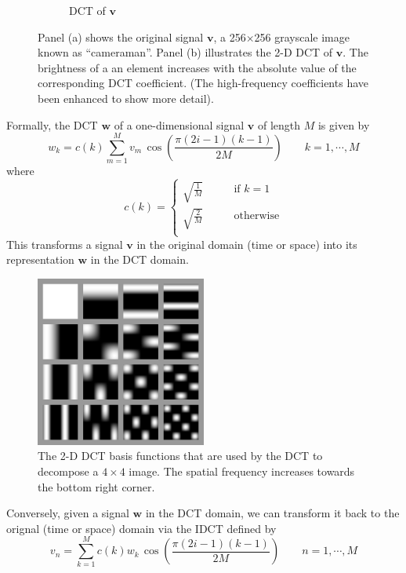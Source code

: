 \begin{figure}
\begin{subfigure}{0.45\textwidth}
    \caption{DCT of $\bm v$}
  \end{subfigure}
  \caption{Panel (a) shows the original signal $\bm v$, a 256$\times$256 grayscale image known as ``cameraman''. Panel (b) illustrates the 2-D DCT of $\bm v$. The brightness of a an element increases with the absolute value of the corresponding DCT coefficient. (The high-frequency coefficients have been enhanced to show more detail).}
  \label{fig:ch3:dct}
\end{figure}

Formally, the DCT $\bm w$ of a one-dimensional signal $\bm v$ of length $M$ is given by
\begin{equation}
  w_k = c(k) \sum_{m=1}^{M} v_m \, \cos\left(\frac{\pi(2i-1)(k-1)}{2M}\right) \qquad k = 1,\cdots,M
\end{equation}
where
\begin{equation*}
  c(k) = \left\{\begin{array}{ll}
  \sqrt{\frac{1}{M}} & \qquad\mbox{if $k=1$}\\
  \sqrt{\frac{2}{M}} & \qquad\mbox{otherwise}\\
  \end{array}\right.
\end{equation*}
This transforms a signal $\bm v$ in the original domain (time or space) into its representation $\bm w$ in the DCT domain.

\begin{figure}
  \centering
  \includegraphics[width=0.5\textwidth]{Chapter3/Images/dct2functions.png}
  \caption{The 2-D DCT basis functions that are used by the DCT to decompose a $4\times 4$ image. 
    The spatial frequency increases towards the bottom right corner.}
  \label{fig:2D-DCT}
\end{figure}

Conversely, given a signal $\bm w$ in the DCT domain, we can transform it back to the orignal (time or space) domain via the IDCT defined by
\begin{equation}
  \label{eqn:idct}
  v_n = \sum_{k=1}^M c(k) w_k  \, \cos\left(\frac{\pi(2i-1)(k-1)}{2M}\right) \qquad n = 1,\cdots,M
\end{equation}

